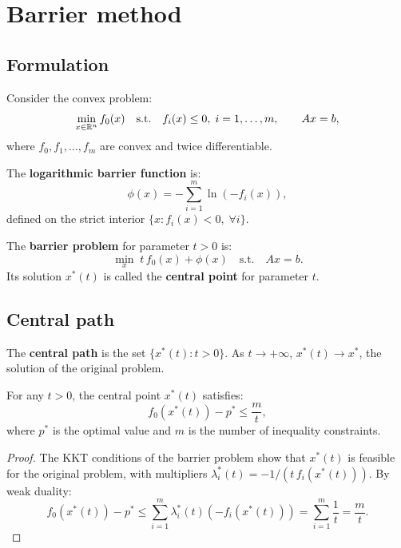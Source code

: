 \section{Barrier method}

\subsection{Formulation}

\begin{definition}
Consider the convex problem:
\[
  \min_{x \in \mathbb{R}^n} f_0(x) \quad \text{s.t.} \quad
  f_i(x) \leq 0,\; i = 1, \ldots, m, \qquad Ax = b,
\]
where $f_0, f_1, \ldots, f_m$ are convex and twice differentiable.
\end{definition}

\begin{definition}
The \textbf{logarithmic barrier function} is:
\[
  \phi(x) = -\sum_{i=1}^m \ln(-f_i(x)),
\]
defined on the strict interior $\{x : f_i(x) < 0,\; \forall i\}$.
\end{definition}

\begin{definition}
The \textbf{barrier problem} for parameter $t > 0$ is:
\[
  \min_x\; t\, f_0(x) + \phi(x) \quad \text{s.t.} \quad Ax = b.
\]
Its solution $x^*(t)$ is called the \textbf{central point} for parameter $t$.
\end{definition}

\subsection{Central path}

\begin{definition}
The \textbf{central path} is the set $\{x^*(t) : t > 0\}$. As
$t \to +\infty$, $x^*(t) \to x^*$, the solution of the original problem.
\end{definition}

\begin{theorem}
For any $t > 0$, the central point $x^*(t)$ satisfies:
\[
  f_0(x^*(t)) - p^* \leq \frac{m}{t},
\]
where $p^*$ is the optimal value and $m$ is the number of inequality
constraints.
\end{theorem}

\begin{proof}
The KKT conditions of the barrier problem show that $x^*(t)$ is feasible for
the original problem, with multipliers
$\lambda_i^*(t) = -1/(t\, f_i(x^*(t)))$. By weak duality:
\[
  f_0(x^*(t)) - p^* \leq \sum_{i=1}^m \lambda_i^*(t)(-f_i(x^*(t)))
  = \sum_{i=1}^m \frac{1}{t} = \frac{m}{t}.
\]
\end{proof}

